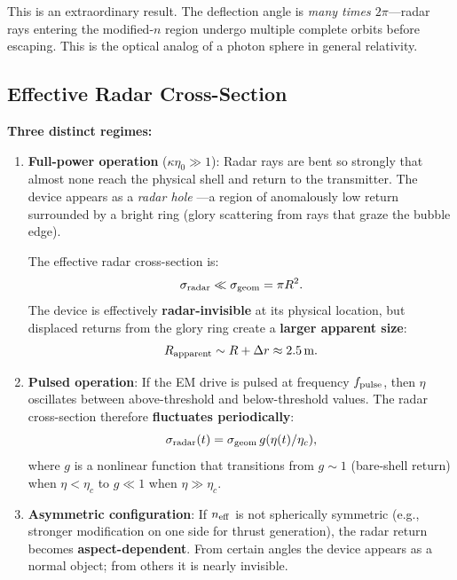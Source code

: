 \documentclass[11pt]{article}
\newcommand{\etac}{\eta_c}
\newcommand{\neff}{n_{\rm eff}}
\begin{document}
This is an extraordinary result. The deflection angle is \emph{many times
$2\pi$}---radar rays entering the modified-$n$ region undergo multiple
complete orbits before escaping. This is the optical analog of a photon
sphere in general relativity.

\subsection{Effective Radar Cross-Section}

\begin{tcolorbox}[colback=blue!5,colframe=blue!50!black,title=Radar Prediction]
\textbf{Three distinct regimes:}

\begin{enumerate}
\item \textbf{Full-power operation} ($\kappa\eta_0 \gg 1$): Radar rays
  are bent so strongly that almost none reach the physical shell and
  return to the transmitter. The device appears as a \emph{radar hole}
  ---a region of anomalously low return surrounded by a bright ring
  (glory scattering from rays that graze the bubble edge).

  The effective radar cross-section is:
  \begin{equation}
  \sigma_{\rm radar} \ll \sigma_{\rm geom} = \pi R^2.
  \end{equation}
  The device is effectively \textbf{radar-invisible} at its physical
  location, but displaced returns from the glory ring create a
  \textbf{larger apparent size}:
  \begin{equation}
  R_{\rm apparent} \sim R + \Delta r \approx 2.5\,\text{m}.
  \end{equation}

\item \textbf{Pulsed operation}: If the EM drive is pulsed at frequency
  $f_{\rm pulse}$, then $\eta$ oscillates between above-threshold and
  below-threshold values. The radar cross-section therefore
  \textbf{fluctuates periodically}:
  \begin{equation}
  \sigma_{\rm radar}(t) = \sigma_{\rm geom}\,g(\eta(t)/\etac),
  \end{equation}
  where $g$ is a nonlinear function that transitions from $g \sim 1$
  (bare-shell return) when $\eta < \etac$ to $g \ll 1$ when
  $\eta \gg \etac$.

\item \textbf{Asymmetric configuration}: If $\neff$ is not spherically
  symmetric (e.g., stronger modification on one side for thrust
  generation), the radar return becomes \textbf{aspect-dependent}. From
  certain angles the device appears as a normal object; from others it
  is nearly invisible.
\end{enumerate}
\end{tcolorbox}
\end{document}
